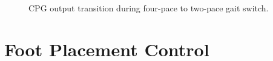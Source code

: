 			\begin{figure}[h!]
				\centering
				\caption{CPG output transition during four-pace to two-pace gait switch.}
				\label{fig::cpg_transition}
			\end{figure}	%



	\section{Foot Placement Control}



